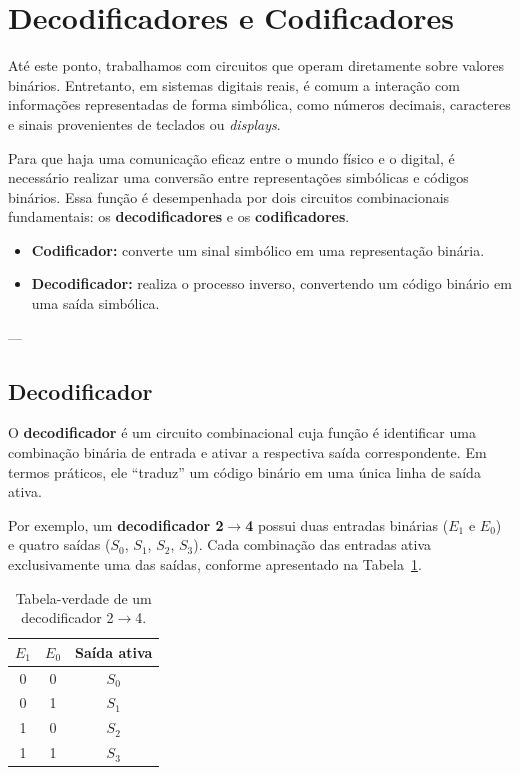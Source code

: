 \documentclass[12pt]{article}
\begin{document}
\section{Decodificadores e Codificadores}

Até este ponto, trabalhamos com circuitos que operam diretamente sobre valores binários.  
Entretanto, em sistemas digitais reais, é comum a interação com informações representadas de forma simbólica, como números decimais, caracteres e sinais provenientes de teclados ou \textit{displays}.  

Para que haja uma comunicação eficaz entre o mundo físico e o digital, é necessário realizar uma conversão entre representações simbólicas e códigos binários.  
Essa função é desempenhada por dois circuitos combinacionais fundamentais: os \textbf{decodificadores} e os \textbf{codificadores}.  

\begin{itemize}
    \item \textbf{Codificador:} converte um sinal simbólico em uma representação binária.
    \item \textbf{Decodificador:} realiza o processo inverso, convertendo um código binário em uma saída simbólica.
\end{itemize}

---

\subsection{Decodificador}

O \textbf{decodificador} é um circuito combinacional cuja função é identificar uma combinação binária de entrada e ativar a respectiva saída correspondente.  
Em termos práticos, ele “traduz” um código binário em uma única linha de saída ativa.  

Por exemplo, um \textbf{decodificador 2$\rightarrow$4} possui duas entradas binárias ($E_1$ e $E_0$) e quatro saídas ($S_0$, $S_1$, $S_2$, $S_3$).  
Cada combinação das entradas ativa exclusivamente uma das saídas, conforme apresentado na Tabela~\ref{tab:decodificador2x4}.

\begin{table}[H]
\centering
\renewcommand{\arraystretch}{1.2}
\begin{tabular}{|c|c|c|}
\hline
$E_1$ & $E_0$ & Saída ativa \\ 
\hline
0 & 0 & $S_0$ \\
0 & 1 & $S_1$ \\
1 & 0 & $S_2$ \\
1 & 1 & $S_3$ \\
\hline
\end{tabular}
\caption{Tabela-verdade de um decodificador 2$\rightarrow$4.}
\label{tab:decodificador2x4}
\end{table}
\end{document}
